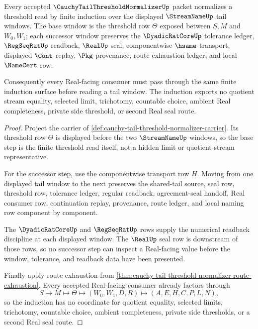 \begin{theorem}
\label{thm:cauchy-tail-threshold-normalizer-tail-window-induction}
Every accepted $\CauchyTailThresholdNormalizerUp$ packet normalizes a threshold read by finite induction over the displayed $\StreamNameUp$ tail windows. The base window is the threshold row $\Theta$ exposed between $S,M$ and $W_0,W_1$; each successor window preserves the $\DyadicRatCoreUp$ tolerance ledger, $\RegSeqRatUp$ readback, $\RealUp$ seal, componentwise $\hsame$ transport, displayed $\Cont$ replay, $\Pkg$ provenance, route-exhaustion ledger, and local $\NameCert$ row.

Consequently every Real-facing consumer must pass through the same finite induction surface before reading a tail window. The induction exports no quotient stream equality, selected limit, trichotomy, countable choice, ambient Real completeness, private side threshold, or second Real seal route.
\end{theorem}
\begin{proof}
Project the carrier of \autoref{def:cauchy-tail-threshold-normalizer-carrier}. Its threshold row $\Theta$ is displayed before the two $\StreamNameUp$ windows, so the base step is the finite threshold read itself, not a hidden limit or quotient-stream representative.

For the successor step, use the componentwise transport row $H$. Moving from one displayed tail window to the next preserves the shared-tail source, seal row, threshold row, tolerance ledger, regular readback, agreement-seal handoff, Real consumer row, continuation replay, provenance, route ledger, and local naming row component by component.

The $\DyadicRatCoreUp$ and $\RegSeqRatUp$ rows supply the numerical readback discipline at each displayed window. The $\RealUp$ seal row is downstream of those rows, so no successor step can inspect a Real-facing value before the window, tolerance, and readback data have been presented.

Finally apply route exhaustion from \autoref{thm:cauchy-tail-threshold-normalizer-route-exhaustion}. Every accepted Real-facing consumer already factors through
$$
S\longmapsto M\longmapsto\Theta\longmapsto(W_0,W_1,D,R)\longmapsto(A,E,H,C,P,L,N),
$$
so the induction has no coordinate for quotient equality, selected limits, trichotomy, countable choice, ambient completeness, private side thresholds, or a second Real seal route.
\end{proof}

